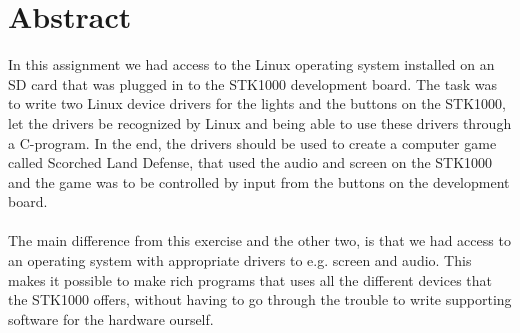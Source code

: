 \section*{Abstract}
In this assignment we had access to the Linux 
operating system installed on an SD card that was 
plugged in to the STK1000 development board. The task
was to write two Linux device drivers for the lights and 
the buttons on the STK1000, let the drivers be recognized 
by Linux and being able to use these drivers through a 
C-program. In the end, the drivers should be used to create a 
computer game called Scorched Land Defense,
that used the audio and screen on the STK1000
and the game was to be controlled by input from the 
buttons on the development board.\\
\\
The main difference from this exercise and the 
other two, is that we had
access to an operating system with appropriate 
drivers to e.g. screen and audio. This makes it possible
to make rich programs that uses all the different devices
that the STK1000 offers, without having to go through
the trouble to write supporting software for the hardware ourself.